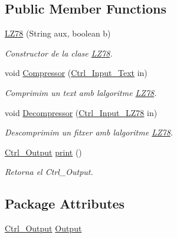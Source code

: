 \subsection*{Public Member Functions}
\begin{DoxyCompactItemize}
\item 
\hyperlink{classdomini_1_1algorithm_1_1LZ78_afb5950cfc6a4887611298f6c1fd83d26}{L\+Z78} (String aux, boolean b)
\begin{DoxyCompactList}\small\item\em Constructor de la clase \hyperlink{classdomini_1_1algorithm_1_1LZ78}{L\+Z78}. \end{DoxyCompactList}\item 
void \hyperlink{classdomini_1_1algorithm_1_1LZ78_a545765a19a5eeababaeeee20fc480116}{Compressor} (\hyperlink{classpersistencia_1_1input_1_1Ctrl__Input__Text}{Ctrl\+\_\+\+Input\+\_\+\+Text} in)
\begin{DoxyCompactList}\small\item\em Comprimim un text amb l\textquotesingle{}algoritme \hyperlink{classdomini_1_1algorithm_1_1LZ78}{L\+Z78}. \end{DoxyCompactList}\item 
void \hyperlink{classdomini_1_1algorithm_1_1LZ78_a9dee2b172b79054a9312b47abce7002c}{Decompressor} (\hyperlink{classpersistencia_1_1input_1_1Ctrl__Input__LZ78}{Ctrl\+\_\+\+Input\+\_\+\+L\+Z78} in)
\begin{DoxyCompactList}\small\item\em Descomprimim un fitxer amb l\textquotesingle{}algoritme \hyperlink{classdomini_1_1algorithm_1_1LZ78}{L\+Z78}. \end{DoxyCompactList}\item 
\hyperlink{classpersistencia_1_1output_1_1Ctrl__Output}{Ctrl\+\_\+\+Output} \hyperlink{classdomini_1_1algorithm_1_1LZ78_a21d2b0f1ce5f3b4603abe6bfff12b494}{print} ()
\begin{DoxyCompactList}\small\item\em Retorna el Ctrl\+\_\+\+Output. \end{DoxyCompactList}\end{DoxyCompactItemize}
\subsection*{Package Attributes}
\begin{DoxyCompactItemize}
\item 
\hyperlink{classpersistencia_1_1output_1_1Ctrl__Output}{Ctrl\+\_\+\+Output} \hyperlink{classdomini_1_1algorithm_1_1LZ78_a6cb1fa950644b379cc4034437047ccb8}{Output}
\end{DoxyCompactItemize}


